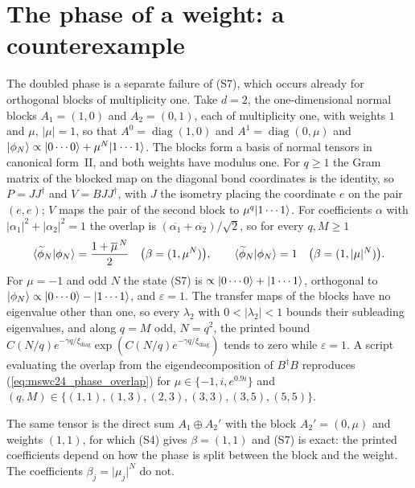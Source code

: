 \documentclass{article}
\begin{document}
\section{The phase of a weight: a counterexample}\label{sec:mswc24_phase_counterexample}
The doubled phase is a separate failure of (S7), which occurs already for orthogonal blocks of
multiplicity one. Take $d=2$, the one-dimensional normal blocks $A_1=(1,0)$ and $A_2=(0,1)$, each
of multiplicity one, with weights $1$ and $\mu$, $\lvert\mu\rvert=1$, so that
$A^0=\operatorname{diag}(1,0)$ and $A^1=\operatorname{diag}(0,\mu)$ and
$|\phi_N\rangle\propto|0\cdots0\rangle+\mu^N|1\cdots1\rangle$. The blocks form a basis of normal tensors
in canonical form~II, and both weights have modulus one. For $q\geq1$ the Gram matrix of the
blocked map on the diagonal bond coordinates is the identity, so $P=JJ^\dagger$ and $V=BJJ^\dagger$,
with $J$ the isometry placing the coordinate $e$ on the pair $(e,e)$; $V$ maps the pair of the
second block to $\mu^q|1\cdots1\rangle$. For coefficients $\alpha$ with
$\lvert\alpha_1\rvert^2+\lvert\alpha_2\rvert^2=1$ the overlap is
$(\overline{\alpha_1}+\overline{\alpha_2})/\sqrt2$, so for every $q,M\geq1$
\begin{align}
    \langle \widetilde\phi_N | \phi_N \rangle=\frac{1+\overline\mu^{\,N}}2
    \quad\bigl(\beta=(1,\mu^N)\bigr),\qquad
    \langle \widetilde\phi_N | \phi_N \rangle=1
    \quad\bigl(\beta=(1,\lvert\mu\rvert^N)\bigr).
    \label{eq:mswc24_phase_overlap}
\end{align}
For $\mu=-1$ and odd $N$ the state (S7) is $\propto|0\cdots0\rangle+|1\cdots1\rangle$, orthogonal to
$|\phi_N\rangle\propto|0\cdots0\rangle-|1\cdots1\rangle$, and $\varepsilon=1$. The transfer maps of the
blocks have no eigenvalue other than one, so every $\lambda_2$ with $0<\lvert\lambda_2\rvert<1$
bounds their subleading eigenvalues, and along $q=M$ odd, $N=q^2$, the printed bound
$C(N/q)e^{-\gamma q/\xi_{\mathrm{diag}}}\exp(C(N/q)e^{-\gamma q/\xi_{\mathrm{diag}}})$ tends to zero
while $\varepsilon=1$. A script evaluating the overlap from the eigendecomposition of $B^\dagger B$
reproduces (\ref{eq:mswc24_phase_overlap}) for $\mu\in\{-1,i,e^{0.9i}\}$ and
$(q,M)\in\{(1,1),(1,3),(2,3),(3,3),(3,5),(5,5)\}$.

The same tensor is the direct sum $A_1\oplus A_2'$ with the block $A_2'=(0,\mu)$ and weights
$(1,1)$, for which (S4) gives $\beta=(1,1)$ and (S7) is exact: the printed coefficients depend on
how the phase is split between the block and the weight. The coefficients
$\beta_j=\lvert\mu_j\rvert^N$ do not.
\end{document}
